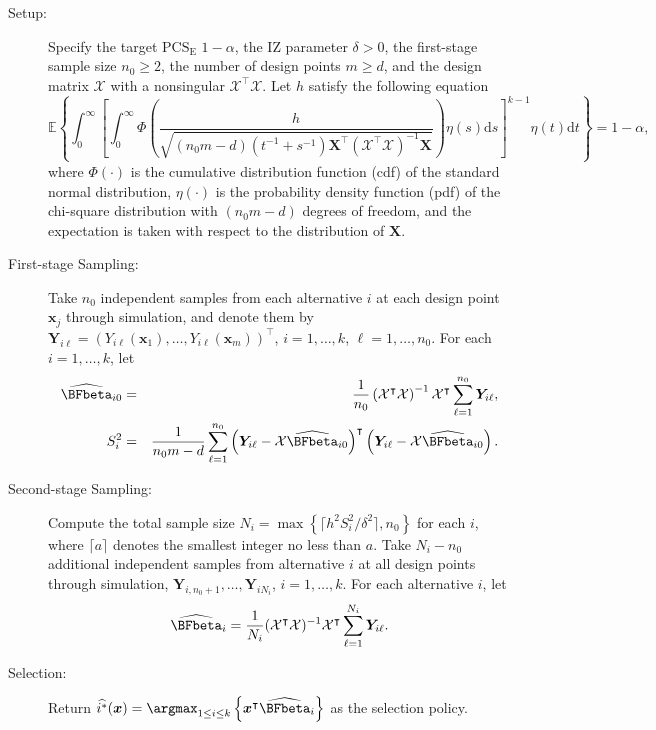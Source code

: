 \documentclass[ijoc,nonblindrev]{informs3}
\def\E{\mathbb{E}}
\def\ud{\mathrm{d}}
\def\bx{{\bm x}}
\def\bX{{\bm X}}
\def\bY{{\bm Y}}
\def\cX{{\mathcal X}}
\def\PCSE{\mathrm{PCS}_{\mathrm{E}}}
\begin{document}
\begin{procedure}[Procedure TS]

\begin{description}
\item[]
\item[Setup:]
Specify the target $\PCSE$ $1-\alpha$, the IZ parameter $\delta > 0$, the first-stage sample size $n_0\geq 2$, the number of design points $m\geq d$, and the design matrix $\mathcal{X}$ with a nonsingular $\cX^\intercal \cX$.
Let $h$ satisfy the following equation
\begin{equation} \label{eq-geth}
\E \left\{ \int_0^\infty \left[\int_0^\infty \Phi \left( \frac{h}{\sqrt{(n_0m-d) (t^{-1}+s^{-1})\bX^\intercal (\cX^\intercal \cX)^{-1} \bX}} \right) \eta(s)\ud s \right]^{k-1} \eta(t) \ud t \right\} = 1-\alpha,
\end{equation}
where $\Phi(\cdot)$ is the cumulative distribution function (cdf) of the standard normal distribution, $\eta(\cdot)$ is the probability density function (pdf) of the chi-square distribution with $(n_0m-d)$ degrees of freedom,
and the expectation is taken with respect to the distribution of $\bX$.

\item[First-stage Sampling:]
Take $n_0$ independent samples from each alternative $i$ at each design point $\bx_j$ through simulation, and denote them by $\bY_{i\ell}=(Y_{i\ell}(\bx_1),\ldots,Y_{i\ell}(\bx_m))^\intercal$,
$i=1,\ldots,k$, $\ell = 1,\ldots,n_0$.
For each $i=1,\ldots,k$, let
\begin{eqnarray*}
\widehat{\BFbeta}_{i0} &=& \frac{1}{n_0} \left(\cX^\intercal \cX\right)^{-1} \cX^\intercal \sum_{\ell=1}^{n_0} \bY_{i\ell},\\
S_i^2 &=& \frac{1}{n_0 m-d} \sum_{\ell=1}^{n_0}\left (\bY_{i\ell}-\cX \widehat{\BFbeta}_{i0} \right)^\intercal \left(\bY_{i\ell}-\cX \widehat{\BFbeta}_{i0} \right).
\end{eqnarray*}

\item[Second-stage Sampling:]
Compute the total sample size $N_i = \max \left\{\lceil h^2 S_i^2/\delta^2\rceil, n_0 \right\}$ for each $i$, where $\lceil a \rceil$ denotes the smallest integer no less than $a$.
Take $N_i-n_0$ additional independent samples from alternative $i$ at all design points through simulation, $\bY_{i,n_0+1}, \ldots, \bY_{iN_i}$, $i=1,\ldots,k$.
For each alternative $i$, let
\[\widehat{\BFbeta}_i = \frac{1}{N_i} (\cX^\intercal \cX)^{-1} \cX^\intercal \sum_{\ell=1}^{N_i} \bY_{i\ell}.\]

\item[Selection:]
Return $\widehat{i^*}(\bx) = \argmax_{1\leq i\leq k}\left \{ \bx^\intercal \widehat{\BFbeta}_i \right\}$ as the selection policy.

\end{description}
\end{procedure}
\end{document}
